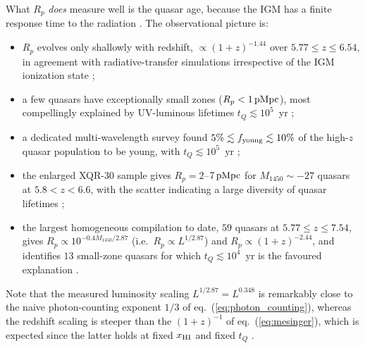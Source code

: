 \documentclass[11pt,a4paper]{article}
\newcommand{\pMpc}{\,{\rm pMpc}}
\begin{document}
What $R_p$ \emph{does} measure well is the quasar age, because the IGM has a finite response time to
the radiation \citep{Eilers2020}. The observational picture is:
\begin{itemize}
  \item $R_p$ evolves only shallowly with redshift, $\propto(1+z)^{-1.44}$ over
        $5.77\le z\le6.54$, in agreement with radiative-transfer simulations irrespective of the IGM
        ionization state \citep{Eilers2017};
  \item a few quasars have exceptionally small zones ($R_p<1\pMpc$), most compellingly explained by
        UV-luminous lifetimes $t_Q\lesssim10^5$~yr \citep{Eilers2017};
  \item a dedicated multi-wavelength survey found $5\%\lesssim f_{\rm young}\lesssim10\%$ of the
        high-$z$ quasar population to be young, with $t_Q\lesssim10^5$~yr \citep{Eilers2020};
  \item the enlarged XQR-30 sample gives $R_p=2$--$7\pMpc$ for $M_{1450}\sim-27$ quasars at
        $5.8<z<6.6$, with the scatter indicating a large diversity of quasar lifetimes
        \citep{Satyavolu2023};
  \item the largest homogeneous compilation to date, $59$ quasars at $5.77\le z\le7.54$, gives
        $R_p\propto 10^{-0.4M_{1450}/2.87}$ (i.e.\ $R_p\propto L^{1/2.87}$) and
        $R_p\propto(1+z)^{-2.44}$, and identifies $13$ small-zone quasars for which
        $t_Q\lesssim10^4$~yr is the favoured explanation \citep{Onorato2025}.
\end{itemize}
Note that the measured luminosity scaling $L^{1/2.87}=L^{0.348}$ is remarkably close to the naive
photon-counting exponent $1/3$ of eq.~(\ref{eq:photon_counting}), whereas the redshift scaling is
steeper than the $(1+z)^{-1}$ of eq.~(\ref{eq:mesinger}), which is expected since the latter holds at
fixed $x_{\rm HI}$ and fixed $t_Q$ \citep{Onorato2025,Mesinger2004}.
\end{document}
